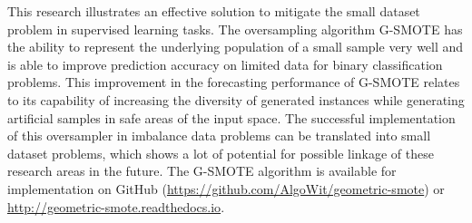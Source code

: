 \documentclass[parskip=full]{scrartcl}
\begin{document}
This research illustrates an effective solution to mitigate the small dataset 
problem in supervised learning tasks. The oversampling algorithm G-SMOTE has 
the ability to represent the underlying population of a small sample very well 
and is able to improve prediction accuracy on limited data for binary 
classification problems. This improvement in the forecasting performance of 
G-SMOTE relates to its capability of increasing the diversity of generated 
instances while generating artificial samples in safe areas of the input space. 
The successful implementation of this oversampler in imbalance data problems 
can be translated into small dataset problems, which shows a lot of potential 
for possible linkage of these research areas in the future. The G-SMOTE 
algorithm is available for implementation on GitHub 
(\url{https://github.com/AlgoWit/geometric-smote}) or 
\url{http://geometric-smote.readthedocs.io}.



\end{document}
